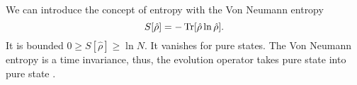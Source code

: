 We can introduce the concept of entropy with the Von Neumann entropy
\begin{equation}
    S[\hat\rho]=-\operatorname{Tr}[\hat\rho\ln\hat\rho].
\end{equation}
It is bounded $0\geq S[\hat\rho] \geq \ln N$. It vanishes for pure states.
The Von Neumann entropy is a time invariance, thus, the evolution operator takes pure state into pure state \cite{Nielsen_Chuang_2010}.
\begin{comment}
    \begin{equation}
        \begin{split}
            S[\hat\rho(t)] &=\Tr[\hat\rho(t)\ln\hat\rho(t)]= \Tr[U(t,0)\hat\rho(t)U^\dagger(t,0)\ln\left(U(t,0)\hat\rho(t)U^\dagger(t,0)\right)]\\
            &=\Tr[U(t,0)\hat\rho(0)U^\dagger(t,0)U(t,0)\ln\left(\hat\rho(0)\right)U^\dagger(t,0)]\\
            &= S[\hat\rho(0)].
        \end{split}
    \end{equation}
    We can move out the evolution operator because they are unitary, since if we consider the taylor expansion
    \begin{equation}
        \begin{split}
            \ln\left(U(t,0)\hat\rho(t)U^\dagger(t,0)\right) &= c_0U(t,0)U^\dagger(t,0) + c_1 U(t,0)\hat\rho(t)U^\dagger(t,0)\\
            & \quad + c_2 U(t,0)\hat\rho(t)U^\dagger(t,0)U(t,0)\hat\rho(t)U^\dagger(t,0) + ... \\
            &=  U(t,0)\ln\left(\hat\rho(t)\right) U^\dagger(t,0).
        \end{split}
    \end{equation}
\end{comment}

\begin{comment}
If we consider the system in contact with a thermal bath with which exchange only energy but conserving it in average, namely the canonical condition hold, there is a stationary state $\hat\rho = e^{-\beta \hat L}$ that maximize the entropy. The parameter $\beta$ is just the inverse of a pseudo-temperature that stands for the interaction with the thermal bath. 
Since the thermal bath actively changes the entries of $\hat L$, it is changing the weight of the network and the probability to move from node $i$ to $j$. Thus, we are considering a network that is changing randomly by time. 
The reader can recognize that this density matrix is the same the De Domenico has introduced \eqref{density_matrix}.
\end{comment}

